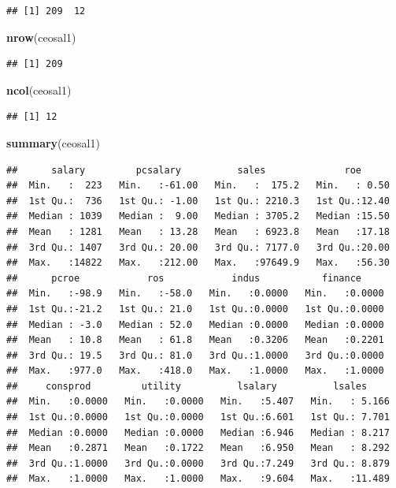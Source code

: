 \documentclass[]{book}
\newenvironment{Shaded}{\begin{snugshade}}{\end{snugshade}}
\newcommand{\KeywordTok}[1]{\textcolor[rgb]{0.13,0.29,0.53}{\textbf{#1}}}
\newcommand{\NormalTok}[1]{#1}
\begin{document}
\begin{verbatim}
## [1] 209  12
\end{verbatim}

\begin{Shaded}
\begin{Highlighting}[]
\KeywordTok{nrow}\NormalTok{(ceosal1)}
\end{Highlighting}
\end{Shaded}

\begin{verbatim}
## [1] 209
\end{verbatim}

\begin{Shaded}
\begin{Highlighting}[]
\KeywordTok{ncol}\NormalTok{(ceosal1)}
\end{Highlighting}
\end{Shaded}

\begin{verbatim}
## [1] 12
\end{verbatim}

\begin{Shaded}
\begin{Highlighting}[]
\KeywordTok{summary}\NormalTok{(ceosal1)}
\end{Highlighting}
\end{Shaded}

\begin{verbatim}
##      salary         pcsalary          sales              roe       
##  Min.   :  223   Min.   :-61.00   Min.   :  175.2   Min.   : 0.50  
##  1st Qu.:  736   1st Qu.: -1.00   1st Qu.: 2210.3   1st Qu.:12.40  
##  Median : 1039   Median :  9.00   Median : 3705.2   Median :15.50  
##  Mean   : 1281   Mean   : 13.28   Mean   : 6923.8   Mean   :17.18  
##  3rd Qu.: 1407   3rd Qu.: 20.00   3rd Qu.: 7177.0   3rd Qu.:20.00  
##  Max.   :14822   Max.   :212.00   Max.   :97649.9   Max.   :56.30  
##      pcroe            ros            indus           finance      
##  Min.   :-98.9   Min.   :-58.0   Min.   :0.0000   Min.   :0.0000  
##  1st Qu.:-21.2   1st Qu.: 21.0   1st Qu.:0.0000   1st Qu.:0.0000  
##  Median : -3.0   Median : 52.0   Median :0.0000   Median :0.0000  
##  Mean   : 10.8   Mean   : 61.8   Mean   :0.3206   Mean   :0.2201  
##  3rd Qu.: 19.5   3rd Qu.: 81.0   3rd Qu.:1.0000   3rd Qu.:0.0000  
##  Max.   :977.0   Max.   :418.0   Max.   :1.0000   Max.   :1.0000  
##     consprod         utility          lsalary          lsales      
##  Min.   :0.0000   Min.   :0.0000   Min.   :5.407   Min.   : 5.166  
##  1st Qu.:0.0000   1st Qu.:0.0000   1st Qu.:6.601   1st Qu.: 7.701  
##  Median :0.0000   Median :0.0000   Median :6.946   Median : 8.217  
##  Mean   :0.2871   Mean   :0.1722   Mean   :6.950   Mean   : 8.292  
##  3rd Qu.:1.0000   3rd Qu.:0.0000   3rd Qu.:7.249   3rd Qu.: 8.879  
##  Max.   :1.0000   Max.   :1.0000   Max.   :9.604   Max.   :11.489
\end{verbatim}
\end{document}
